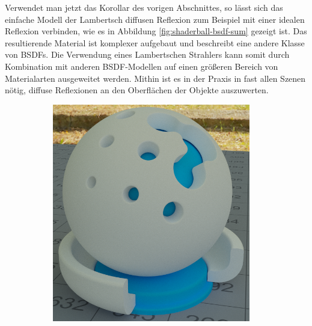 		Verwendet man jetzt das Korollar des vorigen Abschnittes, so lässt sich das einfache Modell der Lambertsch diffusen Reflexion zum Beispiel mit einer idealen Reflexion verbinden, wie es in Abbildung \ref{fig:shaderball-bsdf-sum} gezeigt ist.
		Das resultierende Material ist komplexer aufgebaut und beschreibt eine andere Klasse von BSDFs.
		Die Verwendung eines Lambertschen Strahlers kann somit durch Kombination mit anderen BSDF-Modellen auf einen größeren Bereich von Materialarten ausgeweitet werden.
		Mithin ist es in der Praxis in fast allen Szenen nötig, diffuse Reflexionen an den Oberflächen der Objekte auszuwerten.

		\begin{figure}[h]
			\begin{subfigure}[b]{0.5\textwidth}
				\center
				\includegraphics[width=0.95\textwidth]{pic/shaderball-bsdf_sum-diffuse.png}
			\end{subfigure}
			\begin{subfigure}[b]{0.5\textwidth}
				\center

\end{subfigure}
\end{figure}
